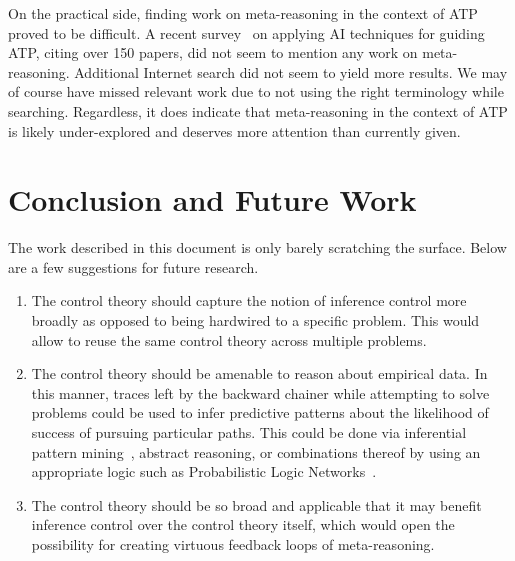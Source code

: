 \documentclass{easychair}
\begin{document}
On the practical side, finding work on meta-reasoning in the context
of ATP proved to be difficult.  A recent
survey~\cite{Blaauwbroek2024LearningGA} on applying AI techniques for
guiding ATP, citing over 150 papers, did not seem to mention any work
on meta-reasoning.  Additional Internet search did not seem to yield
more results.  We may of course have missed relevant work due to not
using the right terminology while searching.  Regardless, it does
indicate that meta-reasoning in the context of ATP is likely
under-explored and deserves more attention than currently given.

\section{Conclusion and Future Work}

The work described in this document is only barely scratching the
surface.  Below are a few suggestions for future research.
\begin{enumerate}
\item The control theory should capture the notion of inference
  control more broadly as opposed to being hardwired to a specific
  problem.  This would allow to reuse the same control theory across
  multiple problems.
\item The control theory should be amenable to reason about empirical
  data.  In this manner, traces left by the backward chainer while
  attempting to solve problems could be used to infer predictive
  patterns about the likelihood of success of pursuing particular
  paths.  This could be done via inferential pattern
  mining~\cite{Geisweiller2019}, abstract reasoning, or combinations
  thereof by using an appropriate logic such as Probabilistic Logic
  Networks~\cite{Goertzel09PLN}.
\item The control theory should be so broad and applicable that it may
  benefit inference control over the control theory itself, which
  would open the possibility for creating virtuous feedback loops of
  meta-reasoning.
\end{enumerate}
\end{document}
